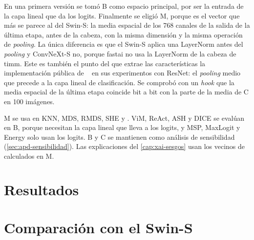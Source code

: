 En una primera versión se tomó B como espacio principal, por ser la entrada de la capa lineal que
da los logits. Finalmente se eligió M, porque es el vector que más se parece al del Swin-S: la
media espacial de los 768 canales de la salida de la última etapa, antes de la cabeza, con la misma
dimensión y la misma operación de \emph{pooling}. La única diferencia es que el Swin-S aplica una
LayerNorm antes del \emph{pooling} y ConvNeXt-S no, porque fastai no usa la LayerNorm de la cabeza
de timm. Este es también el punto del que extrae las características la implementación pública de
\stoodx~\cite{sevillano2026} en sus experimentos con ResNet: el \emph{pooling} medio que precede a
la capa lineal de clasificación.
Se comprobó con un \emph{hook} que la media espacial de la última etapa coincide bit a bit con la
parte de la media de C en 100 imágenes.

M se usa en KNN, MDS, RMDS, SHE y \stoodx. ViM, ReAct, ASH y DICE se evalúan en B, porque necesitan
la capa lineal que lleva a los logits, y MSP, MaxLogit y Energy solo usan los logits. B y C se
mantienen como análisis de sensibilidad (\cref{sec:apd-sensibilidad}). Las explicaciones del
\cref{cap:xai-sesgos} usan los vecinos de \stoodx calculados en M.

\section{Resultados}\label{sec:apd-resultados}






\section{Comparación con el Swin-S}\label{sec:apd-comparacion}

